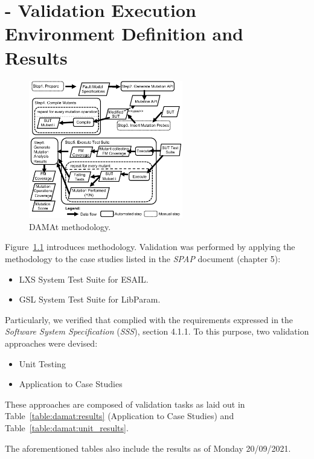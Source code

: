 
\chapter{\DAMA - Validation Execution Environment Definition and Results}

\begin{figure}[h]
  \centering
  \includegraphics[width=0.6\textwidth]{images/dataDrivenBufferProcess.pdf}
      \caption{DAMAt methodology.}
      \label{fig:damat}
\end{figure}

Figure~\ref{fig:damat} introduces \DAMA methodology.
Validation was performed by applying the \DAMA methodology to the case studies listed in the \emph{SPAP} document (chapter 5):
\begin{itemize}
  \item LXS System Test Suite for ESAIL.
  \item GSL System Test Suite for LibParam.
\end{itemize}

Particularly, we verified that \DAMA complied with the requirements expressed in the \emph{Software System Specification} (\emph{SSS}), section 4.1.1.
To this purpose, two validation approaches were devised:
\begin{itemize}
  \item Unit Testing
  \item Application to Case Studies
\end{itemize}

These approaches are composed of validation tasks as laid out in Table~\ref{table:damat:results} (Application to Case Studies) and Table~\ref{table:damat:unit_results}.

The aforementioned tables also include the results as of Monday 20/09/2021.

